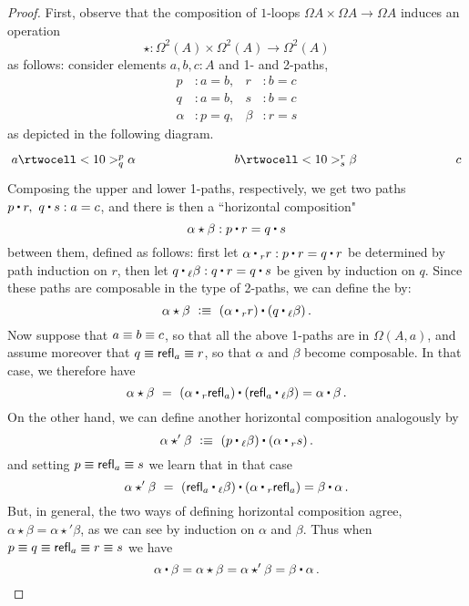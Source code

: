 \begin{proof}
First, observe that the composition of $1$-loops $\Omega A\times \Omega A\to \Omega A$ induces an operation 
\[
\star : \Omega^2(A)\times \Omega^2(A)\to \Omega^2(A)
\]
as follows: consider elements $a, b, c : A$ and 1- and 2-paths,
%
\begin{align*}
  p &: a = b,       &       r &: b = c \\
  q &: a = b,       &       s &: b = c \\
  \alpha &: p = q,  &   \beta &: r = s
\end{align*}
%
as depicted in the following diagram.
\[
 \xymatrix@+5em{
   {a} \rtwocell<10>^p_q{\alpha}
   &
   {b} \rtwocell<10>^r_s{\beta}
   &
   {c}
 }
\]
%
Composing the upper and lower 1-paths, respectively, we get two paths $p\ct r,\ q\ct s : a = c$, and there is then a ``horizontal composition"
%
\begin{equation*}
  \alpha\star\beta : p\ct r = q\ct s
\end{equation*}
%
between them, defined as follows: first let $\alpha \rightwhisker r : p\ct r = q\ct r$ be determined by path induction on $r$, then let $q\leftwhisker \beta : q\ct r = q\ct s$ be given by induction on $q$.  Since these paths are composable in the type of 2-paths, we can define the   by:
\[
\alpha\star\beta\ \defeq\ (\alpha\rightwhisker r) \ct (q\leftwhisker \beta)\, .
\]
Now suppose that $a \equiv  b \equiv  c$, so that all the above 1-paths are in $\Omega(A,a)$, and assume moreover that $q \equiv  \mathsf{refl}_{a}\equiv  r$, so that $\alpha$ and $\beta$ become composable.  In that case, we therefore have
\[
\alpha\star\beta\ =\ (\alpha\rightwhisker\refl{a}) \ct (\refl{a}\leftwhisker \beta) = \alpha \ct \beta\, .
\]
On the other hand, we can define another horizontal composition analogously by
\[
\alpha\star'\beta\ \defeq\ (p\leftwhisker \beta)\ct (\alpha\rightwhisker s)\, .
\]
and setting $p \equiv  \mathsf{refl}_{a}\equiv  s$ we learn that in that case 
\[
\alpha\star'\beta\ =\ (\refl{a}\leftwhisker \beta)\ct (\alpha\rightwhisker \refl{a}) = \beta\ct\alpha\, .
\]
But, in general, the two ways of defining horizontal composition agree, $\alpha\star\beta = \alpha\star'\beta$, as we can see by induction on $\alpha$ and $\beta$.  Thus when $p \equiv  q \equiv  \mathsf{refl}_{a} \equiv  r\equiv  s$ we have
\[\alpha \ct \beta = \alpha\star\beta = \alpha\star'\beta = \beta\ct\alpha\,.
\qedhere
\]
\end{proof}

